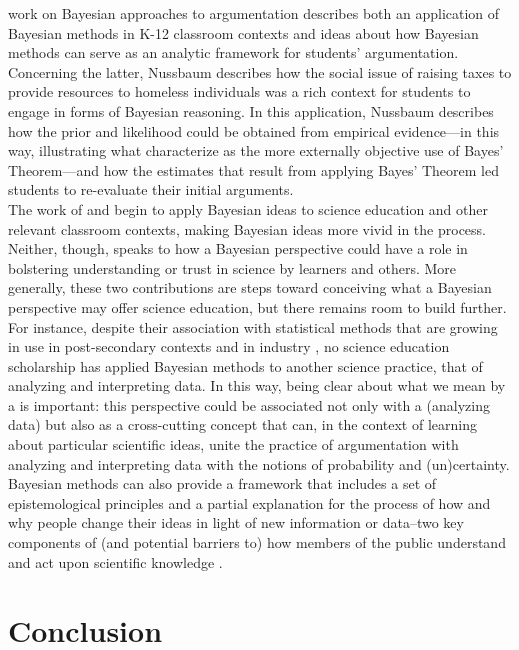 \documentclass[man, floatsintext]{apa7} %
\begin{document}
\textcite{n11} work on Bayesian approaches to argumentation describes both an application of Bayesian methods in K-12 classroom contexts and ideas about how Bayesian methods can serve as an analytic framework for students’ argumentation. Concerning the latter, Nussbaum describes how the social issue of raising taxes to provide resources to homeless individuals was a rich context for students to engage in forms of Bayesian reasoning. In this application, Nussbaum describes how the prior and likelihood could be obtained from empirical evidence—in this way, illustrating what \textcite{so12} characterize as the more externally objective use of Bayes' Theorem—and how the estimates that result from applying Bayes' Theorem led students to re-evaluate their initial arguments. \\

The work of \textcite{so12} and \textcite{n11} begin to apply Bayesian ideas to science education and other relevant classroom contexts, making Bayesian ideas more vivid in the process. Neither, though, speaks to how a Bayesian perspective could have a role in bolstering understanding or trust in science by learners and others. More generally, these two contributions are steps toward conceiving what a Bayesian perspective may offer science education, but there remains room to build further. For instance, despite their association with statistical methods that are growing in use in post-secondary contexts and in industry \parencite{mcgrayne2011theory}, no science education scholarship has applied Bayesian methods to another science practice, that of analyzing and interpreting data. In this way, being clear about what we mean by a  is important: this perspective could be associated not only with a  (analyzing data) but also as a cross-cutting concept \parencite{nrc12} that can, in the context of learning about particular scientific ideas, unite the practice of argumentation with analyzing and interpreting data with the notions of probability and (un)certainty. Bayesian methods can also provide a framework that includes a set of epistemological principles and a partial explanation for the process of how and why people change their ideas in light of new information or data--two key components of (and potential barriers to) how members of the public understand and act upon scientific knowledge \parencite{sinatra2014addressing}.

\section{Conclusion}
\end{document}
